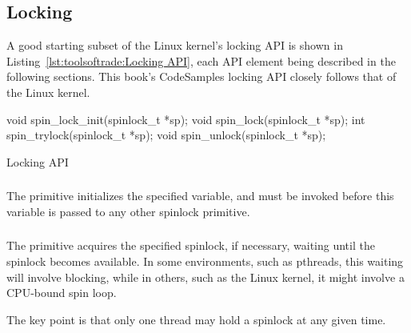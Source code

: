 \QuickQuizEnd

\subsection{Locking}
\label{sec:toolsoftrade:Locking}

A good starting subset of the Linux kernel's locking API is shown in
Listing~\ref{lst:toolsoftrade:Locking API},
each API element being described in the following sections.
This book's CodeSamples locking API closely follows that of the Linux kernel.

\begin{listing}[tbp]
\begin{VerbatimL}[numbers=none]
void spin_lock_init(spinlock_t *sp);
void spin_lock(spinlock_t *sp);
int spin_trylock(spinlock_t *sp);
void spin_unlock(spinlock_t *sp);
\end{VerbatimL}
\caption{Locking API}
\label{lst:toolsoftrade:Locking API}
\end{listing}

\subsubsection{}

The  primitive initializes the specified
 variable, and must be invoked before
this variable is passed to any other spinlock primitive.

\subsubsection{}

The  primitive acquires the specified spinlock,
if necessary, waiting until the spinlock becomes available.
In some environments, such as pthreads, this waiting will involve
blocking, while in others, such as the Linux kernel, it might involve
a CPU-bound spin loop.

The key point is that only one thread may hold a spinlock at any
given time.

\subsubsection{}

